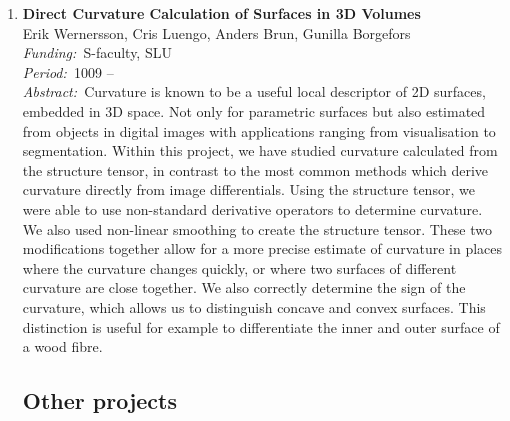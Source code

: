 \documentclass[10pt, a4paper]{article}
\newcommand{\aabstract}[1]{\emph{Abstract:~}#1}
\newcommand{\ffunding}[1]{\emph{Funding:~}#1\\}
\newcommand{\pperiod}[1]{\emph{Period:~}#1\\}
\begin{document}
\begin{enumerate}
\item
\textbf{Direct Curvature Calculation of Surfaces in 3D Volumes }\\
Erik Wernersson, Cris Luengo, Anders Brun, Gunilla Borgefors \\
\ffunding{S-faculty, SLU}
\pperiod{1009 --}
\aabstract{Curvature is known to be a useful local descriptor of 2D 
surfaces, embedded in 3D space. Not only for parametric surfaces but also estimated from objects in digital images with applications ranging from visualisation to segmentation. Within this project, we have studied curvature calculated from the structure tensor, in contrast to the most common methods which derive curvature directly from image differentials. Using the structure
tensor, we were able to use non-standard derivative operators to determine curvature. We also used non-linear smoothing to create the structure tensor. These two modifications together allow for a more precise estimate of curvature in places where the curvature changes quickly, or where two surfaces of different curvature are close together. We also correctly determine the sign of the curvature, which allows us to distinguish concave and convex surfaces. 
This distinction is useful for example to differentiate the inner and outer surface of a wood fibre.}

\clearpage


\subsection{Other projects}



\end{enumerate}
\end{document}

